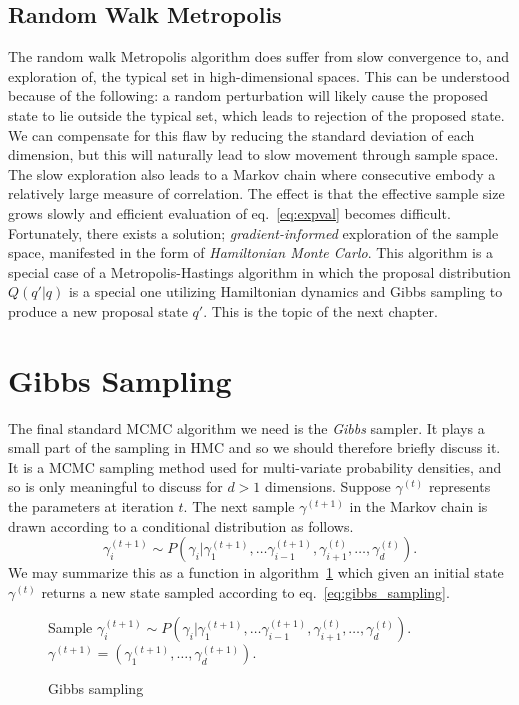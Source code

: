 \subsection{Random Walk Metropolis}
The random walk Metropolis algorithm does suffer from slow convergence to, and exploration of, the typical set in high-dimensional spaces.
This can be understood because of the following: a random perturbation will likely cause the proposed state
to lie outside the typical set, which leads to rejection of the proposed state. We can compensate
for this flaw by reducing the standard deviation of each dimension, but this will naturally lead to slow movement through
sample space. The slow exploration also leads to a Markov chain where consecutive embody
a relatively large measure of correlation. The effect is that the effective sample size grows slowly
and efficient evaluation of eq.~\eqref{eq:expval} becomes difficult.
Fortunately, there exists a solution; \textit{gradient-informed} exploration of the sample space, manifested in
the form of \textit{Hamiltonian Monte Carlo}. This algorithm is a special case of a Metropolis-Hastings algorithm
in which the proposal distribution $Q(q'|q)$ is a special one utilizing Hamiltonian dynamics and Gibbs sampling
to produce a new proposal state $q'$. This is the topic of the next chapter.

\section{Gibbs Sampling}
The final standard MCMC algorithm we need is the \textit{Gibbs} sampler. It plays a small
part of the sampling in HMC and so we should therefore briefly discuss it.
It is a MCMC sampling method used for multi-variate probability densities, and
so is only meaningful to discuss for $d > 1$ dimensions.
Suppose $\gamma^{(t)}$ represents the parameters at iteration $t$. 
The next sample $\gamma^{(t+1)}$ in the Markov chain is drawn according to a
conditional distribution as follows.
\begin{equation}\label{eq:gibbs_sampling}
  \gamma_i^{(t+1)} \sim P(\gamma_i|\gamma_{1}^{(t+1)}, \ldots \gamma_{i-1}^{(t+1)}, \gamma_{i+1}^{(t)}, \ldots, \gamma_{d}^{(t)}).
\end{equation}
We may summarize this as a function in algorithm~\ref{algo:gibbs} which 
given an initial state $\gamma^{(t)}$ returns a new state sampled according to eq.~\eqref{eq:gibbs_sampling}.
\begin{figure}[H]
  \begin{algorithm}[H]
    \caption{Gibbs sampling}\label{algo:gibbs}
    \begin{algorithmic}
          \State Sample $\gamma_i^{(t+1)} \sim P(\gamma_i|\gamma_{1}^{(t+1)}, \ldots \gamma_{i-1}^{(t+1)}, \gamma_{i+1}^{(t)}, \ldots, \gamma_{d}^{(t)}).$
        \EndFor \\
        \Return $\gamma^{(t+1)} = \left(\gamma_1^{(t+1)}, \ldots, \gamma_d^{(t+1)}\right)$.
      \EndFunction
    \end{algorithmic}
  \end{algorithm}
\end{figure}


